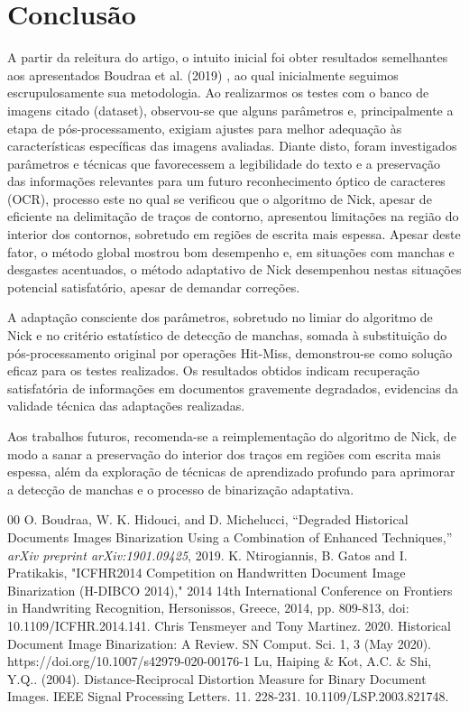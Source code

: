 \documentclass[conference]{IEEEtran}
\begin{document}
\section{Conclusão}
A partir da releitura do artigo, o intuito inicial foi obter resultados semelhantes aos apresentados Boudraa et al. (2019) \cite{boudraa2019}, ao qual inicialmente seguimos escrupulosamente sua metodologia. Ao realizarmos os testes com o banco de imagens citado (dataset), observou-se que alguns parâmetros e, principalmente a etapa de pós-processamento, exigiam ajustes para melhor adequação às características específicas das imagens avaliadas.
Diante disto, foram investigados parâmetros e técnicas que favorecessem a legibilidade do texto e a preservação das informações relevantes para um futuro reconhecimento óptico de caracteres (OCR), processo este no qual se verificou que o algoritmo de Nick, apesar de eficiente na delimitação de traços de contorno, apresentou limitações na região do interior dos contornos, sobretudo em regiões de escrita mais espessa. Apesar deste fator, o método global mostrou bom desempenho e, em situações com manchas e desgastes acentuados, o método adaptativo de Nick desempenhou nestas situações potencial satisfatório, apesar de demandar correções.

A adaptação consciente dos parâmetros, sobretudo no limiar do algoritmo de Nick e no critério estatístico de detecção de manchas, somada à substituição do pós-processamento original por operações Hit-Miss, demonstrou-se como solução eficaz para os testes realizados. Os resultados obtidos indicam recuperação satisfatória de informações em documentos gravemente degradados, evidencias da validade técnica das adaptações realizadas. 

Aos trabalhos futuros, recomenda-se a reimplementação do algoritmo de Nick, de modo a sanar a preservação do interior dos traços em regiões com escrita mais espessa, além da exploração de técnicas de aprendizado profundo para aprimorar a detecção de manchas e o processo de binarização adaptativa.
\begin{thebibliography}{00}
O. Boudraa, W. K. Hidouci, and D. Michelucci, ``Degraded Historical Documents Images Binarization Using a Combination of Enhanced Techniques,'' \textit{arXiv preprint arXiv:1901.09425}, 2019.
K. Ntirogiannis, B. Gatos and I. Pratikakis, "ICFHR2014 Competition on Handwritten Document Image Binarization (H-DIBCO 2014)," 2014 14th International Conference on Frontiers in Handwriting Recognition, Hersonissos, Greece, 2014, pp. 809-813, doi: 10.1109/ICFHR.2014.141.
Chris Tensmeyer and Tony Martinez. 2020. Historical Document Image Binarization: A Review. SN Comput. Sci. 1, 3 (May 2020). https://doi.org/10.1007/s42979-020-00176-1
Lu, Haiping \& Kot, A.C. \& Shi, Y.Q.. (2004). Distance-Reciprocal Distortion Measure for Binary Document Images. IEEE Signal Processing Letters. 11. 228-231. 10.1109/LSP.2003.821748. 
\end{thebibliography}
\end{document}
